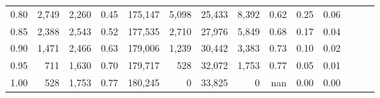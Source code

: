 \begin{tabular}{rrrrrrrrrrrrrr}
0.80 &   2,749 &  2,260 &  0.45 &  175,147 &    5,098 &  25,433 &   8,392 &  0.62 &  0.25 &      0.06 \\
0.85 &   2,388 &  2,543 &  0.52 &  177,535 &    2,710 &  27,976 &   5,849 &  0.68 &  0.17 &      0.04 \\
0.90 &   1,471 &  2,466 &  0.63 &  179,006 &    1,239 &  30,442 &   3,383 &  0.73 &  0.10 &      0.02 \\
0.95 &     711 &  1,630 &  0.70 &  179,717 &      528 &  32,072 &   1,753 &  0.77 &  0.05 &      0.01 \\
1.00 &     528 &  1,753 &  0.77 &  180,245 &        0 &  33,825 &       0 &   nan &  0.00 &      0.00 \\
\bottomrule
\end{tabular}
